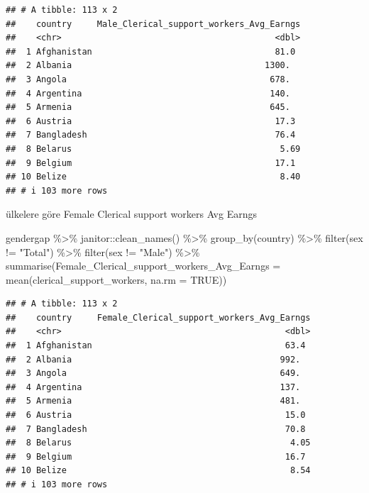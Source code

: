 \documentclass[
]{article}
\newenvironment{Shaded}{\begin{snugshade}}{\end{snugshade}}
\newcommand{\AttributeTok}[1]{\textcolor[rgb]{0.77,0.63,0.00}{#1}}
\newcommand{\ConstantTok}[1]{\textcolor[rgb]{0.00,0.00,0.00}{#1}}
\newcommand{\FunctionTok}[1]{\textcolor[rgb]{0.00,0.00,0.00}{#1}}
\newcommand{\NormalTok}[1]{#1}
\newcommand{\SpecialCharTok}[1]{\textcolor[rgb]{0.00,0.00,0.00}{#1}}
\newcommand{\StringTok}[1]{\textcolor[rgb]{0.31,0.60,0.02}{#1}}
\begin{document}
\begin{verbatim}
## # A tibble: 113 x 2
##    country     Male_Clerical_support_workers_Avg_Earngs
##    <chr>                                          <dbl>
##  1 Afghanistan                                    81.0 
##  2 Albania                                      1300.  
##  3 Angola                                        678.  
##  4 Argentina                                     140.  
##  5 Armenia                                       645.  
##  6 Austria                                        17.3 
##  7 Bangladesh                                     76.4 
##  8 Belarus                                         5.69
##  9 Belgium                                        17.1 
## 10 Belize                                          8.40
## # i 103 more rows
\end{verbatim}

ülkelere göre Female Clerical support workers Avg Earngs

\begin{Shaded}
\begin{Highlighting}[]
\NormalTok{gendergap }\SpecialCharTok{\%\textgreater{}\%}
\NormalTok{  janitor}\SpecialCharTok{::}\FunctionTok{clean\_names}\NormalTok{() }\SpecialCharTok{\%\textgreater{}\%}
  \FunctionTok{group\_by}\NormalTok{(country) }\SpecialCharTok{\%\textgreater{}\%} 
   \FunctionTok{filter}\NormalTok{(sex }\SpecialCharTok{!=} \StringTok{"Total"}\NormalTok{) }\SpecialCharTok{\%\textgreater{}\%}
  \FunctionTok{filter}\NormalTok{(sex }\SpecialCharTok{!=} \StringTok{"Male"}\NormalTok{) }\SpecialCharTok{\%\textgreater{}\%}
  \FunctionTok{summarise}\NormalTok{(}\AttributeTok{Female\_Clerical\_support\_workers\_Avg\_Earngs =} \FunctionTok{mean}\NormalTok{(clerical\_support\_workers, }\AttributeTok{na.rm =} \ConstantTok{TRUE}\NormalTok{))}
\end{Highlighting}
\end{Shaded}

\begin{verbatim}
## # A tibble: 113 x 2
##    country     Female_Clerical_support_workers_Avg_Earngs
##    <chr>                                            <dbl>
##  1 Afghanistan                                      63.4 
##  2 Albania                                         992.  
##  3 Angola                                          649.  
##  4 Argentina                                       137.  
##  5 Armenia                                         481.  
##  6 Austria                                          15.0 
##  7 Bangladesh                                       70.8 
##  8 Belarus                                           4.05
##  9 Belgium                                          16.7 
## 10 Belize                                            8.54
## # i 103 more rows
\end{verbatim}
\end{document}
